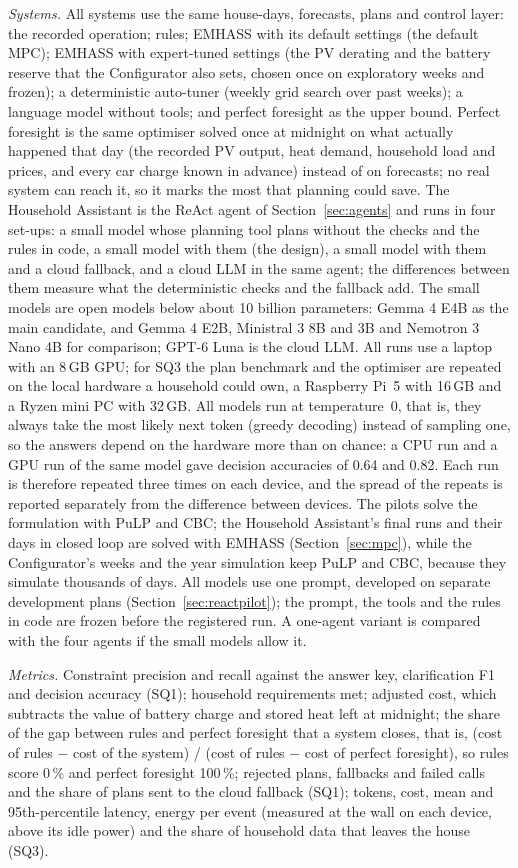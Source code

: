 \documentclass[12pt,a4paper]{report}
\begin{document}
\textit{Systems.} All systems use the same house-days, forecasts, plans
and control layer: the recorded operation; rules; EMHASS with its
default settings (the default MPC); EMHASS with expert-tuned settings
(the PV derating and the battery reserve that the Configurator also
sets, chosen once on exploratory weeks and frozen); a deterministic auto-tuner (weekly grid search over past weeks);
a language model without tools; and perfect foresight as the upper
bound. Perfect foresight is the same optimiser solved once at midnight
on what actually happened that day (the recorded PV output, heat
demand, household load and prices, and every car charge known in
advance) instead of on forecasts; no real system can reach it, so it
marks the most that planning could save. The Household Assistant is the ReAct agent of
Section~\ref{sec:agents} and runs in four set-ups: a small model whose
planning tool plans without the checks and the rules in code, a small
model with them (the design), a small model with them and a cloud
fallback, and a cloud LLM in the same agent; the differences between
them measure what the deterministic checks and the fallback add. The
small models are open models below about 10 billion parameters: Gemma 4
E4B as the main candidate, and Gemma 4 E2B, Ministral 3 8B and 3B and
Nemotron 3 Nano 4B for comparison; GPT-6 Luna is the cloud LLM. All
runs use a laptop with an 8\,GB GPU; for SQ3 the plan benchmark and the
optimiser are repeated on the local hardware a household could own, a
Raspberry Pi~5 with 16\,GB and a Ryzen mini PC with 32\,GB. All models
run at temperature~0, that is, they always take the most likely next
token (greedy decoding) instead of sampling one, so the answers depend
on the hardware more than on chance: a CPU run and a GPU run of the same model gave decision
accuracies of 0.64 and 0.82. Each run is therefore repeated three times
on each device, and the spread of the repeats is reported separately
from the difference between devices. The pilots solve the formulation
with PuLP and CBC; the Household Assistant's final runs and their days
in closed loop are solved with EMHASS (Section~\ref{sec:mpc}), while
the Configurator's weeks and the year simulation keep PuLP and CBC,
because they simulate thousands of days. All models use one prompt, developed on separate development
plans (Section~\ref{sec:reactpilot}); the prompt, the tools and the
rules in code are frozen before the registered run. A one-agent variant is compared
with the four agents if the small models allow it.

\textit{Metrics.} Constraint precision and recall against the answer
key, clarification F1 and decision accuracy (SQ1); household
requirements met; adjusted cost, which subtracts the value of battery
charge and stored heat left at midnight; the share of the gap between
rules and perfect foresight that a system closes, that is, (cost of
rules $-$ cost of the system) / (cost of rules $-$ cost of perfect
foresight), so rules score 0\,\% and perfect foresight 100\,\%; rejected plans,
fallbacks and failed calls and the share of plans sent to the cloud
fallback (SQ1); tokens, cost, mean and 95th-percentile latency, energy
per event (measured at the wall on each device, above its idle power)
and the share of household data that leaves the house (SQ3).
\end{document}
